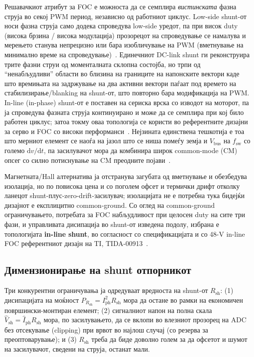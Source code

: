 \documentclass[journal,onecolumn,11pt]{IEEEtran}
\newcommand{\Vdcbus}{V_{\mathrm{bus}}}
\newcommand{\Rshunt}{R_{\mathrm{sh}}}
\newcommand{\Iphrms}{I_{\mathrm{ph}}}
\newcommand{\Fswsw}{f_{\mathrm{sw}}}
\begin{document}
Решавачкиот атрибут за FOC е можноста да се семплира \emph{вистинската} фазна струја во секој PWM
период, независно од работниот циклус. Low-side shunt-от носи фазна струја само додека спроведува
low-side уредот, па при висок duty (висока брзина / висока модулација) прозорецот на спроведување
се намалува и мерењето станува непрецизно или бара изобличување на PWM (вметнување на минимално
време на спроведување)~\cite{ti_lowside_threephase}. Единечниот DC-link shunt ги реконструира трите
фазни струи од моменталната склопна состојба, но трпи од ``ненабљудливи'' области во близина на
границите на напонските вектори каде што времињата на задржување на два активни вектори паѓаат под
времето на стабилизирање/blanking на shunt-от, што повторно бара модификација на PWM. In-line
(in-phase) shunt-от е поставен на сериска врска со изводот на моторот, па ја спроведува фазната
струја континуирано и може да се семплира при кој било работен циклус; затоа токму оваа топологија
се користи во референтните дизајни за серво и FOC со високи перформанси~\cite{tida00913,ina240ds}.
Нејзината единствена тешкотија е тоа што мерниот елемент се наоѓа на јазол што се ниша помеѓу земја и
$\Vdcbus$ на $\Fswsw$ со големо $\mathrm{d}v/\mathrm{d}t$, па засилувачот мора да комбинира широк
common-mode (CM) опсег со силно потиснување на CM преодните појави~\cite{ina240ds,tida00913}.

Магнетната/Hall алтернатива ја отстранува загубата од вметнување и обезбедува изолација, но по
повисока цена и со поголем офсет и термички дрифт отколку ланецот shunt-плус-zero-drift-засилувач;
изолацијата не е потребна тука бидејќи дизајнот е експлицитно common-ground. Со оглед на
common-ground ограничувањето, потребата за FOC набљудливост при целосен duty на сите три фази, и
управливата дисипација во shunt-от изведена подолу, избрана е топологијата \textbf{in-line shunt},
во согласност со спецификацијата и со 48-V in-line FOC референтниот дизајн на TI,
TIDA-00913~\cite{tida00913}.

\subsection{Димензионирање на shunt отпорникот}\label{sec:shunt}
Три конкурентни ограничувања ја одредуваат вредноста на shunt-от $\Rshunt$: (1) дисипацијата на
моќност $P_{\Rshunt}=\Iphrms^2\Rshunt$ мора да остане во рамки на економичен површински-монтиран
елемент; (2) сигналниот напон на полна скала $\hat V_{\mathrm{sh}}=\hat I_{\mathrm{ph}}\Rshunt$ мора,
по засилувањето, да се вклопи во влезниот прозорец на ADC без отсекување (clipping) при врвот во
најлош случај (со резерва за преоптоварување); и (3) $\Rshunt$ треба да биде доволно голем за да
офсетот и шумот на засилувачот, сведени на струја, останат мали.
\end{document}
